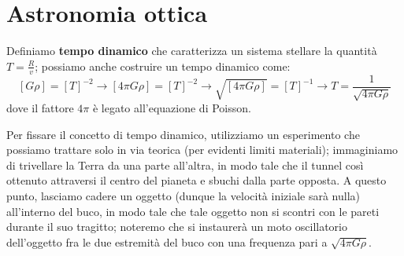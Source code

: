 \section{Astronomia ottica}
Definiamo \textbf{tempo dinamico} che caratterizza un sistema stellare la quantità $T=\frac{R}{v}$; possiamo anche costruire un tempo dinamico come:
$$\left[G \rho \right]=[T]^{-2} \rightarrow \left[ 4 \pi G \rho \right]=\left[T\right]^{-2} \rightarrow \sqrt{ \left[4 \pi G \rho \right]}=\left[ T \right]^{-1} \rightarrow T=\frac{1}{\sqrt{4 \pi G \rho}}$$
dove il fattore $4 \pi$ è legato all'equazione di Poisson.

Per fissare il concetto di tempo dinamico, utilizziamo un esperimento che possiamo trattare solo in via teorica (per evidenti limiti materiali);  immaginiamo di trivellare la Terra da una parte all'altra, in modo tale che il tunnel così ottenuto attraversi il centro del pianeta e sbuchi dalla parte opposta. A questo punto, lasciamo cadere un oggetto (dunque la velocità iniziale sarà nulla) all'interno del buco, in modo tale che tale oggetto non si scontri con le pareti durante il suo tragitto; noteremo che si instaurerà un moto oscillatorio dell'oggetto fra le due estremità del buco con una frequenza pari a $\sqrt{4 \pi G \rho}$.

